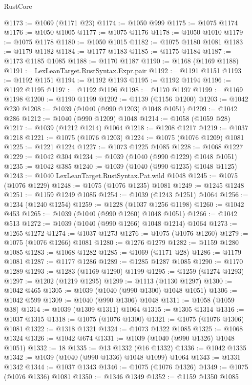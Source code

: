 \begin{lexlean}{RustCore}
\begin{coremodule}
@1173 := @1069 (@1171 @23)
@1174 := @1050 @999
@1175 := @1075 @1174
@1176 := @1050 @1005
@1177 := @1075 @1176
@1178 := @1050 @1010
@1179 := @1075 @1178
@1180 := @1050 @1015
@1182 := @1075 @1180 @1081
@1183 := @1179 @1182
@1184 := @1177 @1183
@1185 := @1175 @1184
@1187 := @1173 @1185 @1085
@1188 := @1170 @1187
@1190 := @1168 (@1169 @1188)
@1191 := LexLeanTarget.RustSyntax.Expr.pair
@1192 := @1191 @1151
@1193 := @1192 @1151
@1194 := @1192 @1193
@1195 := @1192 @1194
@1196 := @1192 @1195
@1197 := @1192 @1196
@1198 := @1170 @1197
@1199 := @1169 @1198
@1200 := @1190 @1199
@1202 := @1139 (@1156 @1200)
@1203 := @1042 @230
@1208 := @1039 (@1040 (@990 @1203) @1048 @1051)
@1209 := @1042 @286
@1212 := @1040 (@990 @1209) @1048
@1214 := @1058 (@1059 @28)
@1217 := @1039 (@1212 @1214) @1064
@1218 := @1208 @1217
@1219 := @1037 @1218
@1221 := @1075 (@1076 @1203)
@1224 := @1075 (@1076 @1209) @1081
@1225 := @1221 @1224
@1227 := @1073 @1225 @1085
@1228 := @1068 @1227
@1229 := @1042 @304
@1234 := @1039 (@1040 (@990 @1229) @1048 @1051)
@1235 := @1042 @385
@1240 := @1039 (@1040 (@990 @1235) @1048 @1125)
@1243 := @1040 LexLeanTarget.RustSyntax.Pat.wild @1048
@1245 := @1075 (@1076 @1229)
@1248 := @1075 (@1076 @1235) @1081
@1249 := @1245 @1248
@1251 := @1159 @1249 @1085
@1254 := @1039 (@1243 @1251) @1064
@1256 := @1234 (@1240 @1254)
@1259 := @1228 (@1037 @1256 @1198)
@1260 := @1042 @453
@1265 := @1039 (@1040 (@990 @1260) @1048 @1051)
@1266 := @1042 @513
@1272 := @1039 (@1040 (@990 @1266) @1048 @1214) @1064
@1273 := @1265 @1272
@1274 := @1037 @1273
@1276 := @1075 (@1076 @1260)
@1279 := @1075 (@1076 @1266) @1081
@1280 := @1276 @1279
@1282 := @1159 @1280 @1085
@1283 := @1068 @1282
@1285 := @1069 (@1171 @28)
@1286 := @1179 @1081
@1287 := @1177 @1286
@1289 := @1285 @1287 @1085
@1290 := @1170 @1289
@1293 := @1283 (@1169 @1290) @1199
@1295 := @1259 (@1274 @1293)
@1297 := @1202 (@1219 @1295)
@1299 := @1113 (@1130 @1297)
@1300 := @1042 @465
@1305 := @1039 (@1040 (@990 @1300) @1048 @1051)
@1306 := @1042 @599
@1309 := @1040 (@990 @1306) @1048
@1311 := @1058 (@1059 @38)
@1314 := @1039 (@1309 @1311) @1064
@1315 := @1305 @1314
@1316 := @1037 @1315
@1318 := @1075 (@1076 @1300)
@1321 := @1075 (@1076 @1306) @1081
@1322 := @1318 @1321
@1324 := @1073 @1322 @1085
@1325 := @1068 @1324
@1326 := @1042 @674
@1331 := @1039 (@1040 (@990 @1326) @1048 @1051)
@1332 := 18
@1335 := @13 @1332 (@16 @1332)
@1336 := @1042 @1335
@1342 := @1039 (@1040 (@990 @1336) @1048 @1099) @1064
@1343 := @1331 @1342
@1344 := @1037 @1343
@1346 := @1075 (@1076 @1326)
@1349 := @1075 (@1076 @1336) @1081
@1350 := @1346 @1349
@1352 := @1159 @1350 @1085

\end{coremodule}
\end{lexlean}

